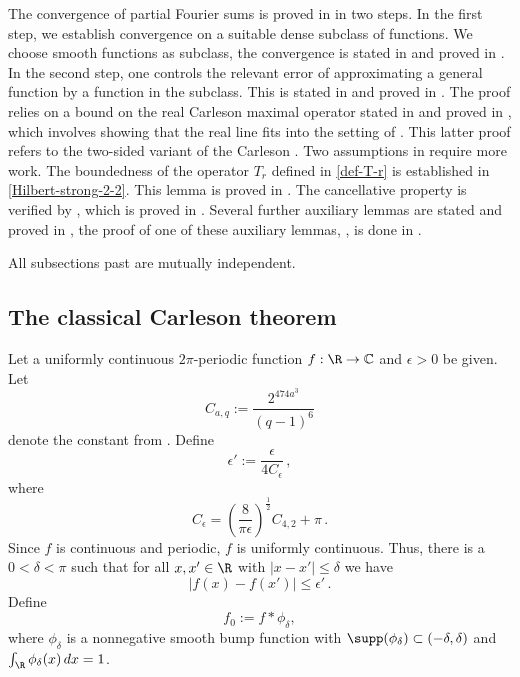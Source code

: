 The convergence of partial Fourier sums is proved in
 in two steps. In the first step,
we establish convergence on a suitable dense subclass of functions. We choose smooth functions as subclass, the convergence is stated in  and proved in .
In the second step, one controls the relevant error of approximating a general function by a function in
the subclass. This is stated in  and proved
in .
The proof relies on a bound on the real Carleson maximal operator stated in  and proved in , which involves showing that the real line fits into the setting of .
This latter proof refers to the two-sided variant of the Carleson . Two assumptions in  require more work. The boundedness of the operator $T_r$ defined in \eqref{def-T-r} is established in \ref{Hilbert-strong-2-2}. This lemma is proved in .
The cancellative property is verified by , which is proved in .
Several further auxiliary lemmas are stated and proved in , the proof of one of these auxiliary lemmas, , is done in .

All subsections past  are mutually independent.



\subsection{The classical Carleson theorem}
\label{10classical}

Let a uniformly continuous $2\pi$-periodic function $f:\R\to \mathbb{C}$ and $\epsilon>0$ be given.
Let
\begin{equation}
    C_{a,q} := \frac{2^{474a^3}}{(q-1)^6}
\end{equation}
denote the constant from .
Define
\begin{equation}
    \epsilon' := \frac {\epsilon} {4 C_\epsilon} \,,
\end{equation}
where
\begin{equation*}
    C_\epsilon = \left(\frac{8}{\pi\epsilon}\right)^\frac{1}{2} C_{4,2} + \pi \,.
\end{equation*}
Since $f$ is continuous and periodic, $f$ is uniformly continuous.
Thus, there is a $0<\delta<\pi$
such that for all $x,x' \in \R$ with $|x-x'|\le \delta$
we have
\begin{equation}\label{uniconbound}
|f(x)-f(x')|\le \epsilon' \, .
\end{equation}
Define
\begin{equation}\label{def-fzero}
f_0:=f \ast \phi_\delta,
\end{equation}
where $\phi_\delta$ is a nonnegative smooth bump function with $\supp (\phi_\delta) \subset (-\delta, \delta)$ and $\int _\R \phi_\delta (x) \, dx = 1$.

